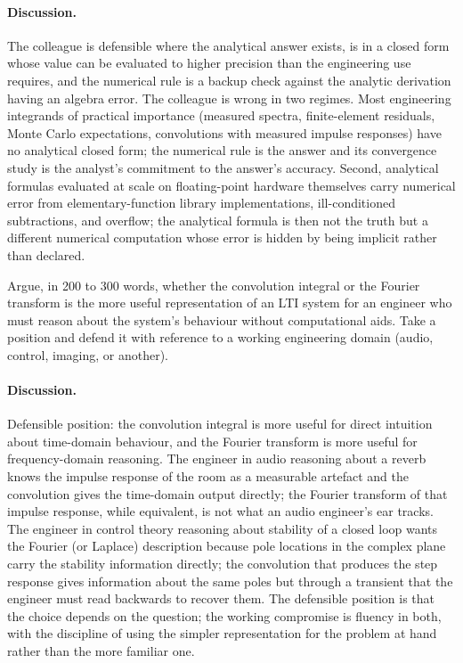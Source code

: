 \paragraph{Discussion.}
The colleague is defensible where the analytical answer exists,
is in a closed form whose value can be evaluated to higher
precision than the engineering use requires, and the numerical
rule is a backup check against the analytic derivation having an
algebra error. The colleague is wrong in two regimes. Most
engineering integrands of practical importance (measured spectra,
finite-element residuals, Monte Carlo expectations, convolutions
with measured impulse responses) have no analytical closed form;
the numerical rule is the answer and its convergence study is
the analyst's commitment to the answer's accuracy. Second,
analytical formulas evaluated at scale on floating-point hardware
themselves carry numerical error from elementary-function library
implementations, ill-conditioned subtractions, and overflow; the
analytical formula is then not the truth but a different
numerical computation whose error is hidden by being implicit
rather than declared.

\begin{exercise}
Argue, in 200 to 300 words, whether the convolution integral or
the Fourier transform is the more useful representation of an LTI
system for an engineer who must reason about the system's
behaviour without computational aids. Take a position and defend
it with reference to a working engineering domain (audio, control,
imaging, or another).
\end{exercise}

\paragraph{Discussion.}
Defensible position: the convolution integral is more useful for
direct intuition about time-domain behaviour, and the Fourier
transform is more useful for frequency-domain reasoning. The
engineer in audio reasoning about a reverb knows the impulse
response of the room as a measurable artefact and the convolution
gives the time-domain output directly; the Fourier transform of
that impulse response, while equivalent, is not what an audio
engineer's ear tracks. The engineer in control theory reasoning
about stability of a closed loop wants the Fourier (or Laplace)
description because pole locations in the complex plane carry the
stability information directly; the convolution that produces
the step response gives information about the same poles but
through a transient that the engineer must read backwards to
recover them. The defensible position is that the choice depends
on the question; the working compromise is fluency in both, with
the discipline of using the simpler representation for the
problem at hand rather than the more familiar one.

